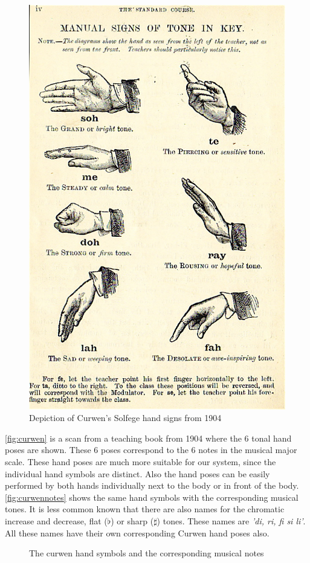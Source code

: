 \begin{figure}[htbp]
	\centering{}
	\includegraphics[width=0.4\linewidth]{figures/curwen.jpg}
	\caption{Depiction of Curwen's Solfege hand signs from 1904}
	\label{fig:curwen}
\end{figure}

\autoref{fig:curwen} is a scan from a teaching book from 1904 where the 6 tonal hand poses are shown. These 6 poses correspond to the 6 notes in the musical major scale. These hand poses are much more suitable for our system, since the individual hand symbols are distinct. Also the hand poses can be easily performed by both hands individually next to the body or in front of the body. \autoref{fig:curwennotes} shows the same hand symbols with the corresponding musical tones. It is less common known that there are also names for the chromatic increase and decrease, flat ($\flat$) or sharp ($\sharp$) tones. These names are \emph{'di, ri, fi si li'}. All these names have their own corresponding Curwen hand poses also.

\begin{figure}[htbp]
	\center{}
	\hspace{0.03\linewidth}
	\caption{The curwen hand symbols and the corresponding musical notes}
	\label{fig:curwennotes}
\end{figure}


